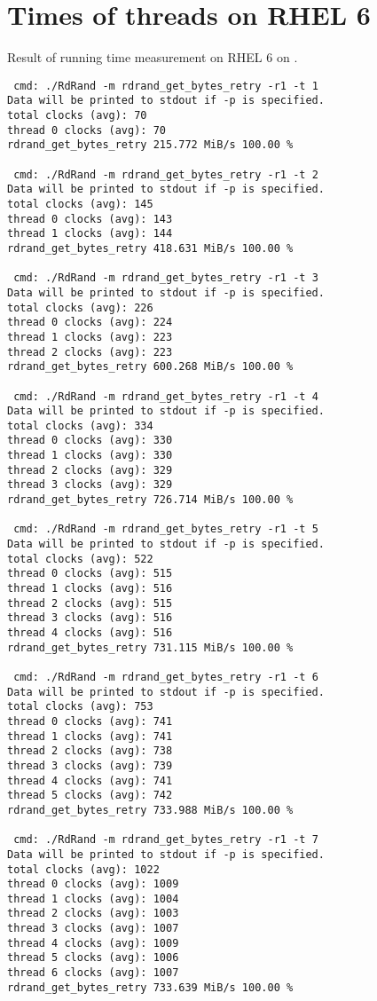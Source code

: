 \section{Times of threads on RHEL 6}\label{attachment:times-of-threads-rhel6}
Result of running time measurement on RHEL 6 on .
\begin{lstlisting}
 cmd: ./RdRand -m rdrand_get_bytes_retry -r1 -t 1
Data will be printed to stdout if -p is specified.
total clocks (avg): 70
thread 0 clocks (avg): 70
rdrand_get_bytes_retry 215.772 MiB/s 100.00 %

 cmd: ./RdRand -m rdrand_get_bytes_retry -r1 -t 2
Data will be printed to stdout if -p is specified.
total clocks (avg): 145
thread 0 clocks (avg): 143
thread 1 clocks (avg): 144
rdrand_get_bytes_retry 418.631 MiB/s 100.00 %

 cmd: ./RdRand -m rdrand_get_bytes_retry -r1 -t 3
Data will be printed to stdout if -p is specified.
total clocks (avg): 226
thread 0 clocks (avg): 224
thread 1 clocks (avg): 223
thread 2 clocks (avg): 223
rdrand_get_bytes_retry 600.268 MiB/s 100.00 %

 cmd: ./RdRand -m rdrand_get_bytes_retry -r1 -t 4
Data will be printed to stdout if -p is specified.
total clocks (avg): 334
thread 0 clocks (avg): 330
thread 1 clocks (avg): 330
thread 2 clocks (avg): 329
thread 3 clocks (avg): 329
rdrand_get_bytes_retry 726.714 MiB/s 100.00 %

 cmd: ./RdRand -m rdrand_get_bytes_retry -r1 -t 5
Data will be printed to stdout if -p is specified.
total clocks (avg): 522
thread 0 clocks (avg): 515
thread 1 clocks (avg): 516
thread 2 clocks (avg): 515
thread 3 clocks (avg): 516
thread 4 clocks (avg): 516
rdrand_get_bytes_retry 731.115 MiB/s 100.00 %

 cmd: ./RdRand -m rdrand_get_bytes_retry -r1 -t 6
Data will be printed to stdout if -p is specified.
total clocks (avg): 753
thread 0 clocks (avg): 741
thread 1 clocks (avg): 741
thread 2 clocks (avg): 738
thread 3 clocks (avg): 739
thread 4 clocks (avg): 741
thread 5 clocks (avg): 742
rdrand_get_bytes_retry 733.988 MiB/s 100.00 %

 cmd: ./RdRand -m rdrand_get_bytes_retry -r1 -t 7
Data will be printed to stdout if -p is specified.
total clocks (avg): 1022
thread 0 clocks (avg): 1009
thread 1 clocks (avg): 1004
thread 2 clocks (avg): 1003
thread 3 clocks (avg): 1007
thread 4 clocks (avg): 1009
thread 5 clocks (avg): 1006
thread 6 clocks (avg): 1007
rdrand_get_bytes_retry 733.639 MiB/s 100.00 %


\end{lstlisting}
